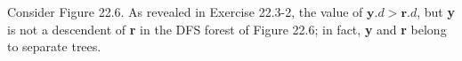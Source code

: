 Consider Figure 22.6. As revealed in Exercise 22.3-2, the value of $ \textbf{y}.d > \textbf{r}.d $, but \textbf{y} is not a descendent of \textbf{r} in the \textsc{DFS} forest of Figure 22.6; in fact, \textbf{y} and \textbf{r} belong to separate trees.